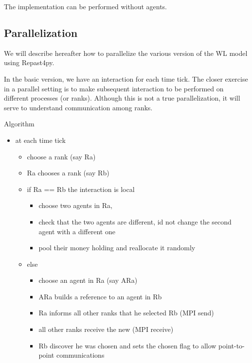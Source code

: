 \documentclass{article}
\providecommand{\tightlist}{%
  \setlength{\itemsep}{0pt}\setlength{\parskip}{0pt}}
\begin{document}
The implementation can be performed without agents.

\subsection{Parallelization}

We will describe hereafter how to parallelize the various version of the
WL model using Repast4py.


In the basic version, we have an interaction for each time tick. The
closer exercise in a parallel setting is to make subsequent interaction
to be performed on different processes (or ranks). Although this is not
a true parallelization, it will serve to understand communication among
ranks.

Algorithm

\begin{itemize}
\tightlist
\item
  at each time tick

  \begin{itemize}
  \tightlist
  \item
    choose a rank (say Ra)
  \item
    Ra chooses a rank (say Rb)
  \item
    if Ra == Rb the interaction is local

    \begin{itemize}
    \tightlist
    \item
      choose two agents in Ra,
    \item
	    check that the two agents are different, id not change the second agent with a different one
    \item
      pool their money holding and reallocate it randomly
    \end{itemize}
  \item
    else

    \begin{itemize}
    \tightlist
    \item
      choose an agent in Ra (say ARa)
    \item
      ARa builds a reference to an agent in Rb
    \item
	    Ra informs all other ranks that he selected Rb (MPI send)
    \item
	    all other ranks receive the new (MPI receive)
    \item
	    Rb discover he was chosen and sets the chosen flag to allow point-to-point communications
	    

\end{itemize}
\end{itemize}
\end{itemize}
\end{document}
